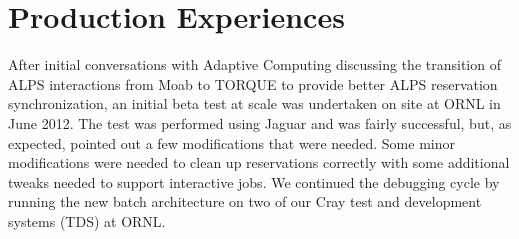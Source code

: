 \section{Production Experiences}

After initial conversations with Adaptive Computing discussing the transition
of ALPS interactions from Moab to TORQUE to provide better ALPS reservation
synchronization, an initial beta test at scale was undertaken on site at ORNL
in June 2012.  The test was performed using Jaguar and was fairly successful,
but, as expected, pointed out a few modifications that were needed.  Some minor
modifications were needed to clean up reservations correctly with some
additional tweaks needed to support interactive jobs.  We continued the
debugging cycle by running the new batch architecture on two of our Cray test
and development systems (TDS) at ORNL.




